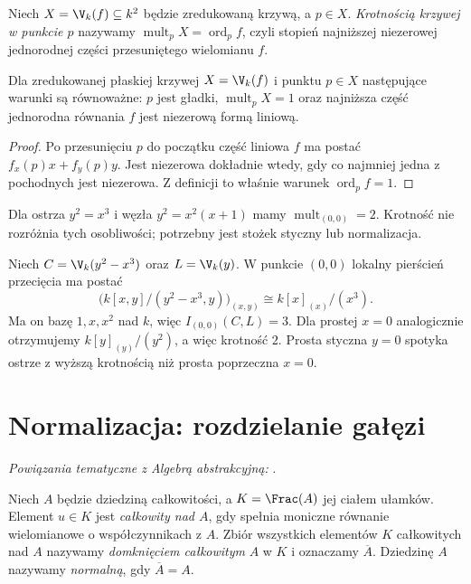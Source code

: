 \begin{definicja}
Niech $X=\V_k(f)\subseteq k^2$ będzie zredukowaną krzywą,
a $p\in X$. \emph{Krotnością krzywej w punkcie $p$}
nazywamy $\operatorname{mult}_pX=\operatorname{ord}_pf$,
czyli stopień najniższej niezerowej jednorodnej części
przesuniętego wielomianu $f$.
\end{definicja}

\begin{stwierdzenie}
Dla zredukowanej płaskiej krzywej $X=\V_k(f)$
i punktu $p\in X$ następujące warunki są równoważne:
$p$ jest gładki, $\operatorname{mult}_pX=1$ oraz
najniższa część jednorodna równania $f$ jest niezerową
formą liniową.
\end{stwierdzenie}
\begin{proof}
Po przesunięciu $p$ do początku część liniowa $f$
ma postać $f_x(p)x+f_y(p)y$. Jest niezerowa dokładnie wtedy,
gdy co najmniej jedna z pochodnych jest niezerowa.
Z definicji to właśnie warunek $\operatorname{ord}_pf=1$.
\end{proof}

\begin{przyklad}
Dla ostrza $y^2=x^3$ i węzła $y^2=x^2(x+1)$
mamy $\operatorname{mult}_{(0,0)}=2$.
Krotność nie rozróżnia tych osobliwości; potrzebny jest
stożek styczny lub normalizacja.
\end{przyklad}

\begin{przyklad}
Niech $C=\V_k(y^2-x^3)$ oraz $L=\V_k(y)$.
W punkcie $(0,0)$ lokalny pierścień przecięcia ma postać
\[
 \bigl(k[x,y]/(y^2-x^3,y)\bigr)_{(x,y)}
 \cong k[x]_{(x)}/(x^3).
\]
Ma on bazę $1,x,x^2$ nad $k$, więc
$I_{(0,0)}(C,L)=3$. Dla prostej $x=0$ analogicznie
otrzymujemy $k[y]_{(y)}/(y^2)$, a więc krotność $2$.
Prosta styczna $y=0$ spotyka ostrze z wyższą krotnością
niż prosta poprzeczna $x=0$.
\end{przyklad}

\section{Normalizacja: rozdzielanie gałęzi}

\noindent\emph{Powiązania tematyczne z Algebrą abstrakcyjną:} .


\begin{definicja}
Niech $A$ będzie dziedziną całkowitości, a
$K=\Frac(A)$ jej ciałem ułamków. Element $u\in K$
jest \emph{całkowity nad $A$}, gdy spełnia moniczne
równanie wielomianowe o współczynnikach z $A$.
Zbiór wszystkich elementów $K$ całkowitych nad $A$
nazywamy \emph{domknięciem całkowitym} $A$ w $K$
i oznaczamy $\overline A$. Dziedzinę $A$ nazywamy
\emph{normalną}, gdy $\overline A=A$.
\end{definicja}

